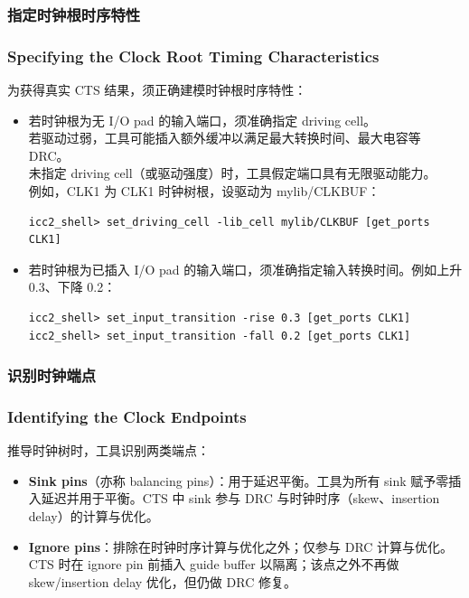 \subsubsection{指定时钟根时序特性}
\subsubsection*{Specifying the Clock Root Timing Characteristics}

为获得真实 CTS 结果，须正确建模时钟根时序特性：
\begin{itemize}
  \item 若时钟根为无 I/O pad 的输入端口，须准确指定 driving cell。\\
        若驱动过弱，工具可能插入额外缓冲以满足最大转换时间、最大电容等 DRC。\\
        未指定 driving cell（或驱动强度）时，工具假定端口具有无限驱动能力。\\
        例如，CLK1 为 CLK1 时钟树根，设驱动为 mylib/CLKBUF：
\begin{lstlisting}
icc2_shell> set_driving_cell -lib_cell mylib/CLKBUF [get_ports CLK1]
\end{lstlisting}
  \item 若时钟根为已插入 I/O pad 的输入端口，须准确指定输入转换时间。例如上升 0.3、下降 0.2：
\begin{lstlisting}
icc2_shell> set_input_transition -rise 0.3 [get_ports CLK1]
icc2_shell> set_input_transition -fall 0.2 [get_ports CLK1]
\end{lstlisting}
\end{itemize}

\subsubsection{识别时钟端点}
\subsubsection*{Identifying the Clock Endpoints}

推导时钟树时，工具识别两类端点：
\begin{itemize}
  \item \textbf{Sink pins}（亦称 balancing pins）：用于延迟平衡。工具为所有 sink 赋予零插入延迟并用于平衡。CTS 中 sink 参与 DRC 与时钟时序（skew、insertion delay）的计算与优化。
  \item \textbf{Ignore pins}：排除在时钟时序计算与优化之外；仅参与 DRC 计算与优化。CTS 时在 ignore pin 前插入 guide buffer 以隔离；该点之外不再做 skew/insertion delay 优化，但仍做 DRC 修复。
\end{itemize}

